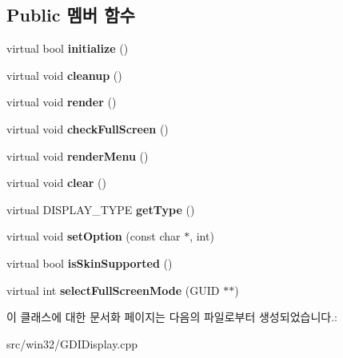 \subsection*{Public 멤버 함수}
\begin{DoxyCompactItemize}
\item 
\mbox{\label{class_g_d_i_display_a7d3e0b3443b68302d759d7cdecd718ef}} 
virtual bool {\bfseries initialize} ()
\item 
\mbox{\label{class_g_d_i_display_ac1bee01ce5982ad75f5d8883133b0ee9}} 
virtual void {\bfseries cleanup} ()
\item 
\mbox{\label{class_g_d_i_display_a7c83b043ba5d2058b8419053615ffabc}} 
virtual void {\bfseries render} ()
\item 
\mbox{\label{class_g_d_i_display_a515bce84bcfc615fe0bb983f2ce3e20b}} 
virtual void {\bfseries check\+Full\+Screen} ()
\item 
\mbox{\label{class_g_d_i_display_a0d38608d640f217ded743d3c88dfe62a}} 
virtual void {\bfseries render\+Menu} ()
\item 
\mbox{\label{class_g_d_i_display_a68a4add7ba35706237739a587131f463}} 
virtual void {\bfseries clear} ()
\item 
\mbox{\label{class_g_d_i_display_a4c7acf65b39361a2a1479c71f6f404a7}} 
virtual D\+I\+S\+P\+L\+A\+Y\+\_\+\+T\+Y\+PE {\bfseries get\+Type} ()
\item 
\mbox{\label{class_g_d_i_display_a4e8f52858b49c9132c77c2f14b13bead}} 
virtual void {\bfseries set\+Option} (const char $\ast$, int)
\item 
\mbox{\label{class_g_d_i_display_aa6c3c9482950413829f81f1aadae9929}} 
virtual bool {\bfseries is\+Skin\+Supported} ()
\item 
\mbox{\label{class_g_d_i_display_ace69c8ae01b3842aebfabb4f008c529d}} 
virtual int {\bfseries select\+Full\+Screen\+Mode} (G\+U\+ID $\ast$$\ast$)
\end{DoxyCompactItemize}


이 클래스에 대한 문서화 페이지는 다음의 파일로부터 생성되었습니다.\+:\begin{DoxyCompactItemize}
\item 
src/win32/G\+D\+I\+Display.\+cpp\end{DoxyCompactItemize}
